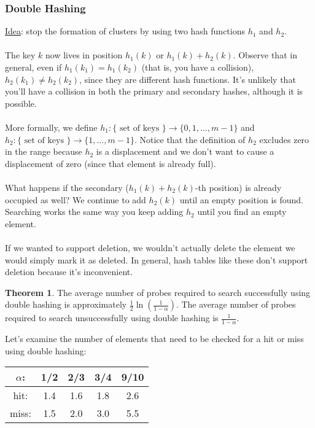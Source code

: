 \documentclass[]{article}
\theoremstyle{definition}
\newtheorem*{theorem}{Theorem}
\begin{document}
			\subsubsection{Double Hashing}
				\underline{Idea}: stop the formation of clusters by using two hash functions $h_1$ and $h_2$.
				\\ \\
				The key $k$ now lives in position $h_1(k)$ or $h_1(k) + h_2(k)$. Observe that in general, even if $h_1(k_1) = h_1(k_2)$ (that is, you have a collision), $h_2(k_1) \ne h_2(k_2)$, since they are different hash functions. It's unlikely that you'll have a collision in both the primary and secondary hashes, although it is possible.
				\\ \\
				More formally, we define $h_1: \{\text{ set of keys }\} \to \{0, 1, \ldots, m - 1\}$ and $h_2: \{\text{ set of keys }\} \to \{1, \ldots, m - 1\}$. Notice that the definition of $h_2$ excludes zero in the range because $h_2$ is a displacement and we don't want to cause a displacement of zero (since that element is already full).
				\\ \\
				What happens if the secondary ($h_1(k) + h_2(k)$-th position) is already occupied as well? We continue to add $h_2(k)$ until an empty position is found. Searching works the same way \textendash{} you keep adding $h_2$ until you find an empty element.
				\\ \\
				If we wanted to support deletion, we wouldn't actually delete the element \textendash{} we would simply mark it as deleted. In general, hash tables like these don't support deletion because it's inconvenient.
				\begin{theorem}
					The average number of probes required to search successfully using double hashing is approximately $\frac{1}{2} \ln \left( \frac{1}{1 - \alpha} \right)$. The average number of probes required to search unsuccessfully using double hashing is $\frac{1}{1 - \alpha}$.
				\end{theorem}
				
				Let's examine the number of elements that need to be checked for a hit or miss using double hashing:
				\begin{center}
					\begin{tabular}{c|c|c|c|c}
						$\alpha$: & 1/2 & 2/3 & 3/4 & 9/10 \\ \hline
						hit: & 1.4 & 1.6 & 1.8 & 2.6 \\
						miss: & 1.5 & 2.0 & 3.0 & 5.5
					\end{tabular}
				\end{center}
\end{document}
